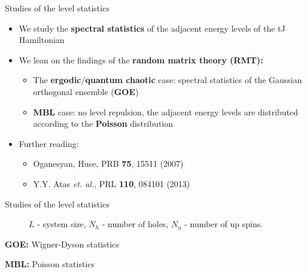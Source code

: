 \documentclass[1pt]{beamer}
\begin{document}
\begin{frame}{Studies of the level statistics}
\begin{itemize}
\item We study the \textbf{spectral statistics} of the adjacent energy levels of the tJ Hamiltonian \vspace{7mm}
\item We lean on the findings of the \textbf{random matrix theory (RMT):} \vspace{3mm}
	\begin{itemize}
		\item The \textbf{ergodic}/\textbf{quantum chaotic} case: spectral statistics of the Gaussian orthogonal ensemble (\textbf{GOE}) \vspace{3mm}
		\item \textbf{MBL} case: no level repulsion, the adjacent energy levels are distributed according to the \textbf{Poisson} distribution
	\end{itemize}\vspace{5mm}
\item Further reading:
	\begin{itemize}
		\item Oganesyan, Huse, PRB \textbf{75}, 15511 (2007)
		\item Y.Y. Atas \emph{et. al.}, PRL \textbf{110}, 084101 (2013)
	\end{itemize}
\end{itemize}

\end{frame}
\begin{frame}{Studies of the level statistics}
\begin{figure}
\caption{$L$ - system size, $N_h$ - number of holes, $N_u$ - number of up spins.}
\end{figure}
\begin{minipage}{0.48\textwidth}
\centering \textbf{GOE:} Wigner-Dyson statistics
\end{minipage}\hfill
\begin{minipage}{0.48\textwidth}
\centering \textbf{MBL:} Poisson statistics 
\end{minipage}
\end{frame}
\end{document}
